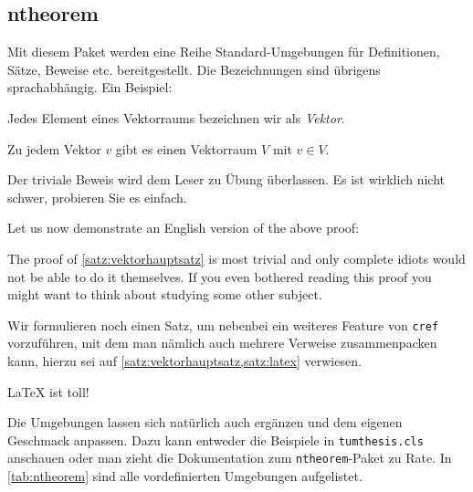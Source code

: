 \subsection{ntheorem}
\label{sec:intro:ntheorem}
Mit diesem Paket werden eine Reihe Standard-Umgebungen für Definitionen, Sätze,
Beweise etc. bereitgestellt. Die Bezeichnungen sind übrigens sprachabhängig. Ein
Beispiel:
\begin{definition}
  Jedes Element eines Vektorraums bezeichnen wir als \emph{Vektor}.
\end{definition}

\begin{satz}
  \label{satz:vektorhauptsatz}
  Zu jedem Vektor $v$ gibt es einen Vektorraum $V$ mit $v \in V$.
\end{satz}
\begin{beweis}
  Der triviale Beweis wird dem Leser zu Übung überlassen. Es ist wirklich nicht
  schwer, probieren Sie es einfach. 
\end{beweis}

Let us now demonstrate an English version of the above proof:
\begin{beweis}
  The proof of \cref{satz:vektorhauptsatz} is most trivial and only complete
  idiots would not be able to do it themselves. If you even bothered reading
  this proof you might want to think about studying some other subject.
\end{beweis}

Wir formulieren noch einen Satz, um nebenbei ein weiteres Feature von
\texttt{cref} vorzuführen, mit dem man nämlich auch mehrere Verweise
zusammenpacken kann, hierzu sei auf \cref{satz:vektorhauptsatz,satz:latex}
verwiesen.
\begin{satz}
\label{satz:latex}
  \LaTeX{} ist toll!
\end{satz}

Die Umgebungen lassen sich natürlich auch ergänzen und dem eigenen Geschmack
anpassen. Dazu kann entweder die Beispiele in \texttt{tumthesis.cls} anschauen
oder man zieht die Dokumentation \cite{ntheorem} zum \texttt{ntheorem}-Paket zu
Rate. In \cref{tab:ntheorem} sind alle vordefinierten Umgebungen aufgelistet.

